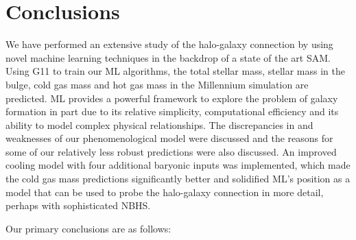 \documentclass[a4paper,fleqn,usenatbib]{mnras}
\begin{document}
\section{Conclusions} \label{conclusion}
We have performed an extensive study of the halo-galaxy connection by using novel machine learning techniques in the backdrop of a state of the art SAM. Using G11 to train our ML algorithms, the total stellar mass, stellar mass in the bulge, cold gas mass and hot gas mass in the Millennium simulation are predicted. ML provides a powerful framework to explore the problem of galaxy formation in part due to its relative simplicity, computational efficiency and its ability to model complex physical relationships. The discrepancies in and weaknesses of our phenomenological model were discussed and the reasons for some of our relatively less robust predictions were also discussed. An improved cooling model with four additional baryonic inputs was implemented, which made the cold gas mass predictions significantly better and solidified ML's position as a model that can be used to probe the halo-galaxy connection in more detail, perhaps with sophisticated NBHS. 
\par
Our primary conclusions are as follows:
\end{document}

